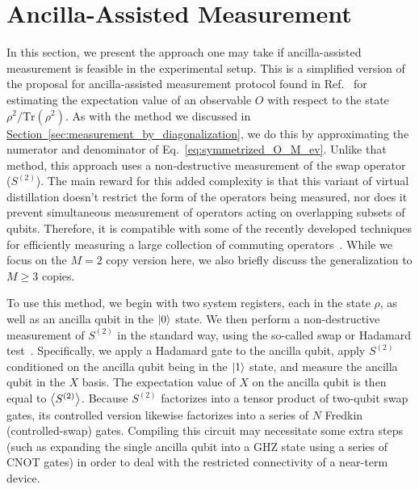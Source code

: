 \documentclass[
amsmath,
amssymb,
aps,
pra,
reprint,
twocolumn,
superscriptaddress,
longbibliography,
showkeys,
floatfix
]{revtex4-1}
\def\ket#1{\ensuremath{\mathinner{|{#1}\rangle}}}
\def\tr{\mathrm{Tr}}
\newcommand{\eq}[1]{Eq.~\hyperref[eq:#1]{\ref*{eq:#1}}}
\renewcommand{\sec}[1]{\hyperref[sec:#1]{Section~\ref*{sec:#1}}}
\begin{document}
\section{Ancilla-Assisted Measurement}
\label{app:ancilla_assisted_measurement}

In this section, we present the approach one may take if ancilla-assisted
measurement is feasible in the experimental setup. 
This is a simplified version of the proposal for ancilla-assisted measurement
protocol found in Ref.~ for estimating the expectation
value of an observable \(O\) with respect to the state \(\rho^2 / \tr(\rho^2)\).
As with the method we discussed in \sec{measurement_by_diagonalization}, we do
this by approximating the numerator and denominator of \eq{symmetrized_O_M_ev}.
Unlike that method, this approach uses a non-destructive measurement of the swap
operator (\(S^{(2)}\)). 
The main reward for this added complexity is that this variant of virtual
distillation doesn't restrict the form of the operators being measured, nor does
it prevent simultaneous measurement of operators acting on overlapping subsets
of qubits. 
Therefore, it is compatible with some of the recently developed techniques for
efficiently measuring a large collection of commuting
operators~\cite{Cotler2020-xc, Bonet-Monroig2020-lc, Huggins2019-vu}. 
While we focus on the \(M=2\) copy version here, we also briefly discuss the
generalization to \(M\geq 3\) copies. 

To use this method, we begin with two system registers, each in the state
\(\rho\), as well as an ancilla qubit in the \(\ket{0}\) state.  
We then perform a non-destructive measurement of \(S^{(2)}\) in the standard
way, using the so-called swap or Hadamard
test~\cite{Yu_Kitaev1995-zv,Horodecki2002-pf, Ekert2002-gl}.
Specifically, we apply a Hadamard gate to the ancilla qubit, apply \(S^{(2)}\)
conditioned on the ancilla qubit being in the \(\ket{1}\) state, and measure the
ancilla qubit in the \(X\) basis.
The expectation value of \(X\) on the ancilla qubit is then equal to
\(\ev{S^{(2)}}\).
Because \(S^{(2)}\) factorizes into a tensor product of two-qubit swap gates,
its controlled version likewise factorizes into a series of \(N\) Fredkin
(controlled-swap) gates. Compiling this circuit may necessitate some extra steps
(such as expanding the single ancilla qubit into a GHZ state using a series of
CNOT gates) in order to deal with the restricted connectivity of a near-term device.
\end{document}
